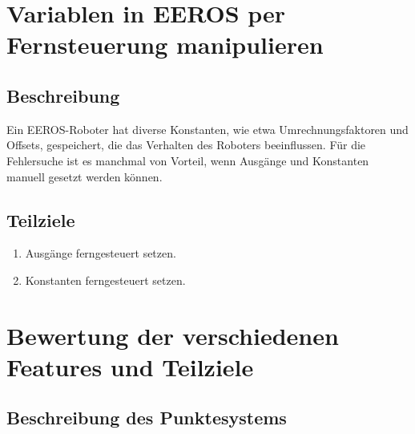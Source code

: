 \section{Variablen in EEROS per Fernsteuerung manipulieren}
\subsection{Beschreibung}
Ein EEROS-Roboter hat diverse Konstanten, wie etwa Umrechnungsfaktoren und Offsets, gespeichert, die das Verhalten des Roboters beeinflussen.
Für die Fehlersuche ist es manchmal von Vorteil, wenn Ausgänge und Konstanten manuell gesetzt werden können.

\subsection{Teilziele}
\begin{enumerate}
\item Ausgänge ferngesteuert setzen.
\item Konstanten ferngesteuert setzen.
\end{enumerate}


\section{Bewertung der verschiedenen Features und Teilziele}
\subsection{Beschreibung des Punktesystems}

